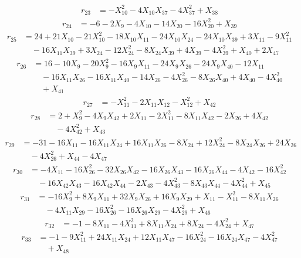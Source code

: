 \begin{align*}
r_{23}&=-X_{10}^{2}-4X_{10}X_{37}-4X_{37}^{2}+X_{38}
\end{align*}
\begin{align*}
r_{24}&=-6-2X_{9}-4X_{10}-14X_{20}-16X_{20}^{2}+X_{39}
\end{align*}
\begin{align*}
r_{25}&=24+21X_{10}-21X_{10}^{2}-18X_{10}X_{11}-24X_{10}X_{24}-24X_{10}X_{39}+3X_{11}-9X_{11}^{2}\\
&\quad -16X_{11}X_{39}+3X_{24}-12X_{24}^{2}-8X_{24}X_{39}+4X_{39}-4X_{39}^{2}+X_{40}+2X_{47}
\end{align*}
\begin{align*}
r_{26}&=16-10X_{9}-20X_{9}^{2}-16X_{9}X_{11}-24X_{9}X_{26}-24X_{9}X_{40}-12X_{11}\\
&\quad -16X_{11}X_{26}-16X_{11}X_{40}-14X_{26}-4X_{26}^{2}-8X_{26}X_{40}+4X_{40}-4X_{40}^{2}\\
&\quad +X_{41}
\end{align*}
\begin{align*}
r_{27}&=-X_{11}^{2}-2X_{11}X_{12}-X_{12}^{2}+X_{42}
\end{align*}
\begin{align*}
r_{28}&=2+X_{9}^{2}-4X_{9}X_{42}+2X_{11}-2X_{11}^{2}-8X_{11}X_{42}-2X_{26}+4X_{42}\\
&\quad -4X_{42}^{2}+X_{43}
\end{align*}
\begin{align*}
r_{29}&=-31-16X_{11}-16X_{11}X_{24}+16X_{11}X_{26}-8X_{24}+12X_{24}^{2}-8X_{24}X_{26}+24X_{26}\\
&\quad -4X_{26}^{2}+X_{44}-4X_{47}
\end{align*}
\begin{align*}
r_{30}&=-4X_{11}-16X_{26}^{2}-32X_{26}X_{42}-16X_{26}X_{43}-16X_{26}X_{44}-4X_{42}-16X_{42}^{2}\\
&\quad -16X_{42}X_{43}-16X_{42}X_{44}-2X_{43}-4X_{43}^{2}-8X_{43}X_{44}-4X_{44}^{2}+X_{45}
\end{align*}
\begin{align*}
r_{31}&=-16X_{9}^{2}+8X_{9}X_{11}+32X_{9}X_{26}+16X_{9}X_{29}+X_{11}-X_{11}^{2}-8X_{11}X_{26}\\
&\quad -4X_{11}X_{29}-16X_{26}^{2}-16X_{26}X_{29}-4X_{29}^{2}+X_{46}
\end{align*}
\begin{align*}
r_{32}&=-1-8X_{11}-4X_{11}^{2}+8X_{11}X_{24}+8X_{24}-4X_{24}^{2}+X_{47}
\end{align*}
\begin{align*}
r_{33}&=-1-9X_{11}^{2}+24X_{11}X_{24}+12X_{11}X_{47}-16X_{24}^{2}-16X_{24}X_{47}-4X_{47}^{2}\\
&\quad +X_{48}
\end{align*}
